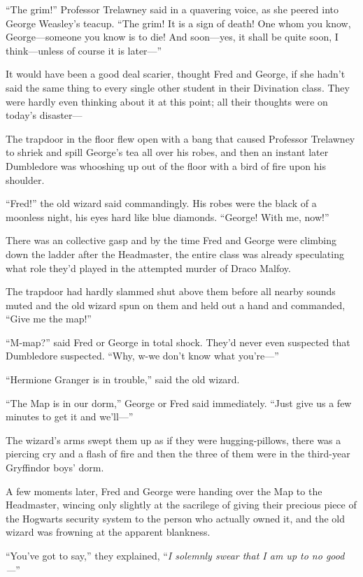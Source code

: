 “The grim!” Professor Trelawney said in a quavering voice, as she peered into George Weasley’s teacup. “The grim! It is a sign of death! One whom you know, George—someone you know is to die! And soon—yes, it shall be quite soon, I think—unless of course it is later—”

It would have been a good deal scarier, thought Fred and George, if she hadn’t said the same thing to every single other student in their Divination class. They were hardly even thinking about it at this point; all their thoughts were on today’s disaster—

The trapdoor in the floor flew open with a bang that caused Professor Trelawney to shriek and spill George’s tea all over his robes, and then an instant later Dumbledore was whooshing up out of the floor with a bird of fire upon his shoulder.

“Fred!” the old wizard said commandingly. His robes were the black of a moonless night, his eyes hard like blue diamonds. “George! With me, now!”

There was an collective gasp and by the time Fred and George were climbing down the ladder after the Headmaster, the entire class was already speculating what role they’d played in the attempted murder of Draco Malfoy.

The trapdoor had hardly slammed shut above them before all nearby sounds muted and the old wizard spun on them and held out a hand and commanded, “Give me the map!”

“M-map?” said Fred or George in total shock. They’d never even suspected that Dumbledore suspected. “Why, w-we don’t know what you’re—”

“Hermione Granger is in trouble,” said the old wizard.

“The Map is in our dorm,” George or Fred said immediately. “Just give us a few minutes to get it and we’ll—”

The wizard’s arms swept them up as if they were hugging-pillows, there was a piercing cry and a flash of fire and then the three of them were in the third-year Gryffindor boys’ dorm.

A few moments later, Fred and George were handing over the Map to the Headmaster, wincing only slightly at the sacrilege of giving their precious piece of the Hogwarts security system to the person who actually owned it, and the old wizard was frowning at the apparent blankness.

“You’ve got to say,” they explained, “\emph{I solemnly swear that I am up to no good—}”

